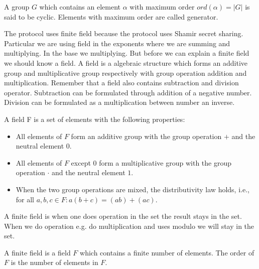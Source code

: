 \begin{defi}
A group $G$ which contains an element $ \alpha $ with maximum order $ord( \alpha ) = |G|$ is said to be cyclic. Elements with maximum order are called generator.
\end{defi}



 The protocol uses finite field because the protocol uses Shamir secret sharing. Particular we are using field in the exponents where we are summing and multiplying. In the base we multiplying.  But before we can explain a finite field we should know a field. A field is a  algebraic structure which forms an additive group and multiplicative group  respectively with group operation addition and multiplication. Remember that a field also contains subtraction and division operator. Subtraction can be formulated through addition of a negative number. Division can be formulated as a multiplication between number an inverse.  
\begin{defi}
A field F is a set of elements with the following properties:
\begin{itemize}
\item  All elements of $F$ form an additive group with the group operation $+$ and the neutral element $0$.
\item  All elements of $F$ except $0$ form a multiplicative group with the group operation $ \cdot $ and the neutral element $1$.
\item When the two group operations are mixed, the distributivity law holds, i.e., for all $a,b,c \in F: a(b+c) = (ab)+(ac)$.
\end{itemize}
\end{defi}
 A finite field is when one does operation in the set the result stays in the set. When we do operation e.g. do multiplication and uses modulo we will stay in the set.
\begin{defi}
A finite field is a field $F$ which contains a finite number of elements. The order of $F$ is the number of elements in $F$.
\end{defi}

